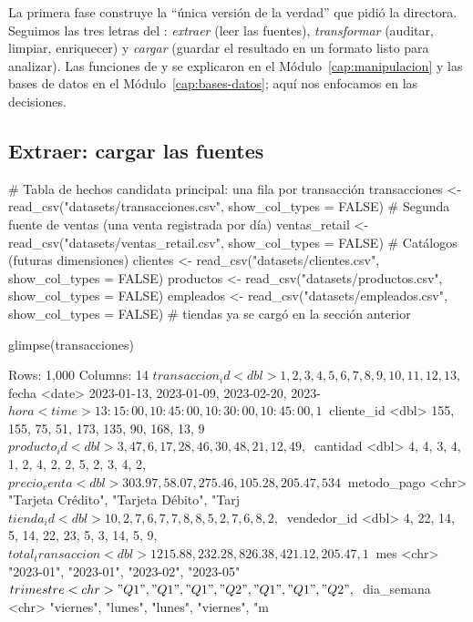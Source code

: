 La primera fase construye la ``única versión de la verdad'' que pidió la
directora. Seguimos las tres letras del : \emph{extraer} (leer
las fuentes), \emph{transformar} (auditar, limpiar, enriquecer) y
\emph{cargar} (guardar el resultado en un formato listo para analizar). Las
funciones de  y  se explicaron en el
Módulo~\ref{cap:manipulacion} y las bases de datos en el
Módulo~\ref{cap:bases-datos}; aquí nos enfocamos en las decisiones.

\subsection{Extraer: cargar las fuentes}

\begin{rcode}
# Tabla de hechos candidata principal: una fila por transacción
transacciones <- read_csv("datasets/transacciones.csv",
                          show_col_types = FALSE)
# Segunda fuente de ventas (una venta registrada por día)
ventas_retail <- read_csv("datasets/ventas_retail.csv",
                          show_col_types = FALSE)
# Catálogos (futuras dimensiones)
clientes  <- read_csv("datasets/clientes.csv",  show_col_types = FALSE)
productos <- read_csv("datasets/productos.csv", show_col_types = FALSE)
empleados <- read_csv("datasets/empleados.csv", show_col_types = FALSE)
# tiendas ya se cargó en la sección anterior

glimpse(transacciones)
\end{rcode}

\begin{rsalida}
Rows: 1,000
Columns: 14
$ transaccion_id    <dbl> 1, 2, 3, 4, 5, 6, 7, 8, 9, 10, 11, 12, 13,~
$ fecha             <date> 2023-01-13, 2023-01-09, 2023-02-20, 2023-~
$ hora              <time> 13:15:00, 10:45:00, 10:30:00, 10:45:00, 1~
$ cliente_id        <dbl> 155, 155, 75, 51, 173, 135, 90, 168, 13, 9~
$ producto_id       <dbl> 3, 47, 6, 17, 28, 46, 30, 48, 21, 12, 49, ~
$ cantidad          <dbl> 4, 4, 3, 4, 1, 2, 4, 2, 2, 5, 2, 3, 4, 2, ~
$ precio_venta      <dbl> 303.97, 58.07, 275.46, 105.28, 205.47, 534~
$ metodo_pago       <chr> "Tarjeta Crédito", "Tarjeta Débito", "Tarj~
$ tienda_id         <dbl> 10, 2, 7, 6, 7, 7, 8, 8, 5, 2, 7, 6, 8, 2,~
$ vendedor_id       <dbl> 4, 22, 14, 5, 14, 22, 23, 5, 3, 14, 5, 9, ~
$ total_transaccion <dbl> 1215.88, 232.28, 826.38, 421.12, 205.47, 1~
$ mes               <chr> "2023-01", "2023-01", "2023-02", "2023-05"~
$ trimestre         <chr> "Q1", "Q1", "Q1", "Q2", "Q1", "Q1", "Q2", ~
$ dia_semana        <chr> "viernes", "lunes", "lunes", "viernes", "m~
\end{rsalida}

